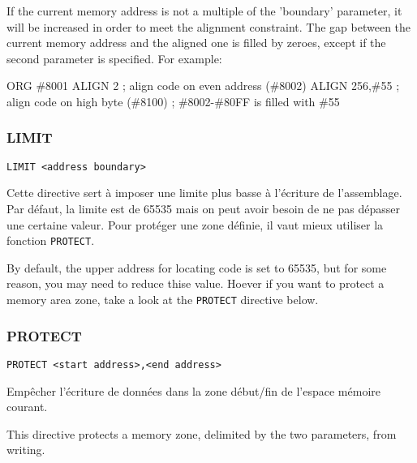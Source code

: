 \begin{xen}
If the current memory address is not a multiple of the 'boundary' parameter, it will be increased in order to meet the alignment constraint.
The gap between the current memory address and the aligned one is filled by zeroes, except if the second parameter is specified. For example:
\end{xen}

\begin{code}
ORG \#8001
ALIGN 2       ; align code on even address (\#8002)
ALIGN 256,\#55 ; align code on high byte (\#8100)
; \#8002-\#80FF is filled with \#55
\end{code}

\subsubsection{LIMIT}
\begin{verbatim}
LIMIT <address boundary>
\end{verbatim}

\begin{xfr}
Cette directive sert à imposer une limite plus basse à l'écriture de l'assemblage.
Par défaut, la limite est de 65535 mais on peut avoir besoin de ne pas dépasser une certaine valeur.
Pour protéger une zone définie, il vaut mieux utiliser la fonction \texttt{PROTECT}.
\end{xfr}

\begin{xen}
By default, the upper address for locating code is set to 65535, but for some reason, you may need to
reduce thise value.
Hoever if you want to protect a memory area zone, take a look at the \texttt{PROTECT} directive below.
\end{xen}

\subsubsection{PROTECT}
\begin{verbatim}
PROTECT <start address>,<end address>
\end{verbatim}

\begin{xfr}
Empêcher l'écriture de données dans la zone début/fin de l'espace mémoire courant.
\end{xfr}

\begin{xen}
This directive protects a memory zone, delimited by the two parameters, from writing.
\end{xen}

